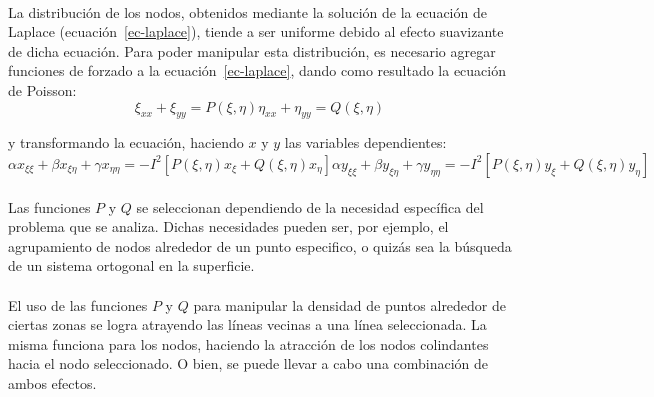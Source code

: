 \documentclass[letterpaper, openright, 12pt]{book}
\begin{document}
    \paragraph*{}
    La distribución de los nodos, obtenidos mediante la solución de la
    ecuación de Laplace (ecuación~\ref{ec-laplace}), tiende a ser uniforme
    debido al efecto suavizante de dicha ecuación. Para poder manipular esta
    distribución, es necesario agregar funciones de forzado a la
    ecuación~\ref{ec-laplace}, dando como resultado la ecuación de Poisson:
    \begin{subequations}
        \begin{equation}
            \xi_{xx} + \xi_{yy} = P(\xi, \eta)
        \end{equation}
        \begin{equation}
            \eta_{xx} + \eta_{yy} = Q(\xi, \eta)
        \end{equation}
        \label{ec-poisson}
    \end{subequations}

    y transformando la ecuación, haciendo $x$ y $y$ las variables
    dependientes:
    \begin{subequations}
        \begin{equation}
            \alpha x_{\xi \xi} + \beta x_{\xi \eta}
                + \gamma x_{\eta \eta} = -I^2 [P(\xi, \eta) x_{\xi}
                + Q(\xi, \eta) x_{\eta}]
        \end{equation}
        \begin{equation}
            \alpha y_{\xi \xi} + \beta y_{\xi \eta} + \gamma y_{\eta \eta} = -I^2 [P(\xi, \eta) y_{\xi} + Q(\xi, \eta) y_{\eta}]
        \end{equation}
        \label{ec-poisson-invertida}
    \end{subequations}

    \paragraph*{}
    Las funciones $P$ y $Q$ se seleccionan dependiendo de la necesidad
    específica del problema que se analiza. Dichas necesidades pueden ser,
    por ejemplo, el agrupamiento de nodos alrededor de un punto especifico,
    o quizás sea la búsqueda de un sistema ortogonal en la superficie.

    \paragraph*{}
    El uso de las funciones $P$ y $Q$ para manipular la densidad de puntos
    alrededor de ciertas zonas se logra atrayendo las líneas vecinas a una
    línea seleccionada. La misma funciona para los nodos, haciendo la
    atracción de los nodos colindantes hacia el nodo seleccionado. O bien,
    se puede llevar a cabo una combinación de ambos efectos.
\end{document}
